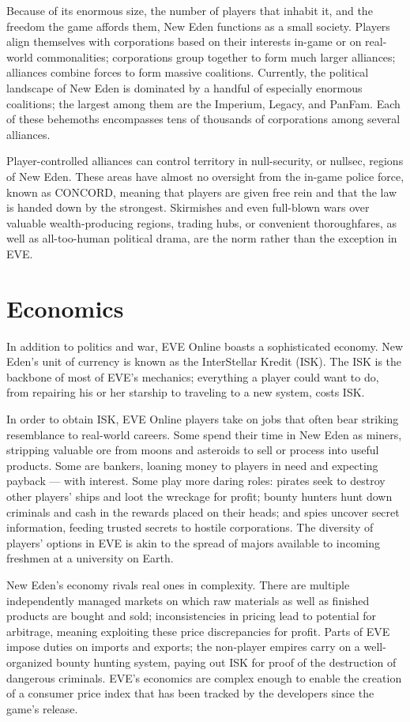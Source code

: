\documentclass[letterpaper,12pt,article]{memoir}
\begin{document}
Because of its enormous size, the number of players that inhabit it, and the 
freedom the game affords them, New Eden functions as a small society. Players
align themselves with corporations based on their interests in-game or on
real-world commonalities; corporations group together to form much larger
alliances; alliances combine forces to form massive coalitions. Currently, the
political landscape of New Eden is dominated by a handful of especially 
enormous coalitions; the largest among them are the Imperium, Legacy, and PanFam.
Each of these behemoths encompasses tens of thousands of corporations among
several alliances. \cite{EVEalliances}

Player-controlled alliances can control territory in null-security, or nullsec,
regions of New Eden. These areas have almost no oversight from the in-game police
force, known as CONCORD, meaning that players are given free rein and that the
law is handed down by the strongest. Skirmishes and even full-blown wars over
valuable wealth-producing regions, trading hubs, or convenient thoroughfares,
as well as all-too-human political drama, are the norm rather than the exception
in EVE.

\section{Economics}

In addition to politics and war, EVE Online boasts a sophisticated economy. New
Eden's unit of currency is known as the InterStellar Kredit (ISK). The ISK is the 
backbone of most of EVE's mechanics; everything a player could want to do, from
repairing his or her starship to traveling to a new system, costs ISK. 

In order to obtain ISK, EVE Online players take on jobs that often bear striking
resemblance to real-world careers. Some spend their time in New Eden as miners,
stripping valuable ore from moons and asteroids to sell or process into useful
products. Some are bankers, loaning money to players in need and expecting 
payback --- with interest. Some play more daring roles: pirates seek to destroy
other players' ships and loot the wreckage for profit; bounty hunters hunt down 
criminals and cash in the rewards placed on their heads; and spies uncover
secret information, feeding trusted secrets to hostile corporations. The
diversity of players' options in EVE is akin to the spread of majors available
to incoming freshmen at a university on Earth.

New Eden's economy rivals real ones in complexity. There are multiple 
independently managed markets on which raw materials as well as finished products
are bought and sold; inconsistencies in pricing lead to potential for arbitrage,
meaning exploiting these price discrepancies for profit. Parts of EVE impose duties
on imports and exports; the non-player empires carry on a well-organized bounty
hunting system, paying out ISK for proof of the destruction of dangerous 
criminals. EVE's economics are complex enough to enable the creation of a 
consumer price index that has been tracked by the developers since the game's
release.
\end{document}
